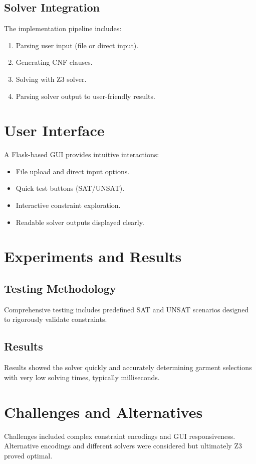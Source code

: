 \documentclass[unicode,11pt,a4paper,oneside,numbers=endperiod,openany]{scrartcl}
\begin{document}
\subsection{Solver Integration}
The implementation pipeline includes:
\begin{enumerate}
    \item Parsing user input (file or direct input).
    \item Generating CNF clauses.
    \item Solving with Z3 solver.
    \item Parsing solver output to user-friendly results.
\end{enumerate}

\section{User Interface}
A Flask-based GUI provides intuitive interactions:
\begin{itemize}
    \item File upload and direct input options.
    \item Quick test buttons (SAT/UNSAT).
    \item Interactive constraint exploration.
    \item Readable solver outputs displayed clearly.
\end{itemize}

\section{Experiments and Results}
\subsection{Testing Methodology}
Comprehensive testing includes predefined SAT and UNSAT scenarios designed to rigorously validate constraints.

\subsection{Results}
Results showed the solver quickly and accurately determining garment selections with very low solving times, typically milliseconds.

\section{Challenges and Alternatives}
Challenges included complex constraint encodings and GUI responsiveness. Alternative encodings and different solvers were considered but ultimately Z3 proved optimal.
\end{document}
